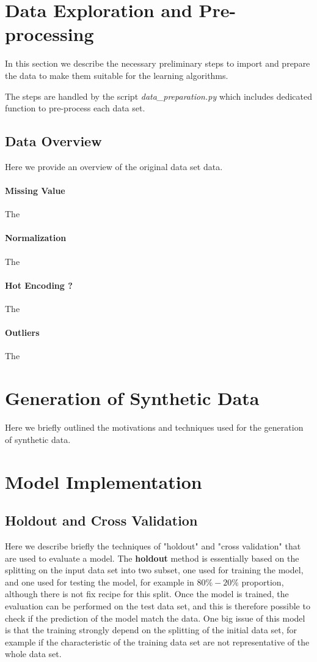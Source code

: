 \documentclass{article}
\begin{document}
\section{Data Exploration and Pre-processing}
In this section we describe the necessary preliminary steps to import and prepare the data to make them suitable for the learning algorithms.

The steps are handled by the script \textit{data\_preparation.py} which includes dedicated function to pre-process each data set.

\subsection{Data Overview}
Here we provide an overview of the original data set data. 

\paragraph{Missing Value}
The 
\paragraph{Normalization}
The 
\paragraph{Hot Encoding ? }
The 
\paragraph{Outliers}
The 

\section{Generation of Synthetic Data}
Here we briefly outlined the motivations and techniques used for the generation of synthetic data.


\section{Model Implementation}

\subsection{Holdout and Cross Validation}
Here we describe briefly the techniques of "holdout" and "cross validation" that are used to evaluate a model. The \textbf{holdout} method is essentially based on the splitting on the input data set into two subset, one used for training the model, and one used for testing the model, for example in $80\%-20\%$ proportion, although there is not fix recipe for this split. Once the model is trained, the evaluation can be performed on the test data set, and this is therefore possible to check if the prediction of the model match the data. One big issue of this model is that the training strongly depend on the splitting of the initial data set, for example if the characteristic of the training data set are not representative of the whole data set. 
\end{document}
